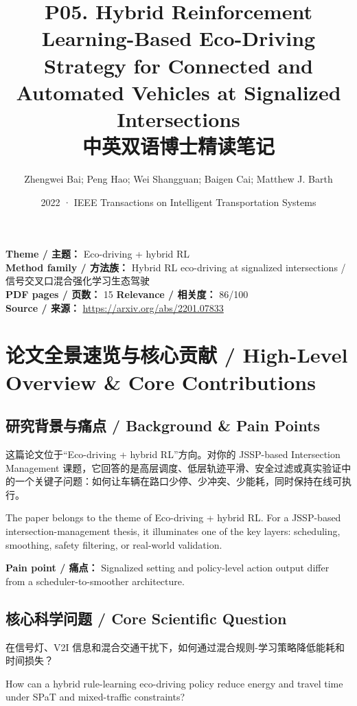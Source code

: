 \documentclass[UTF8,a4paper,11pt,fontset=fandol]{ctexart}
\title{P05. Hybrid Reinforcement Learning-Based Eco-Driving Strategy for Connected and Automated Vehicles at Signalized Intersections\\中英双语博士精读笔记}
\author{Zhengwei Bai; Peng Hao; Wei Shangguan; Baigen Cai; Matthew J. Barth}
\date{2022 · IEEE Transactions on Intelligent Transportation Systems}
\begin{document}
\maketitle

\noindent\textbf{Theme / 主题：} Eco-driving + hybrid RL\\
\textbf{Method family / 方法族：} Hybrid RL eco-driving at signalized intersections / 信号交叉口混合强化学习生态驾驶\\
\textbf{PDF pages / 页数：} 15 \quad
\textbf{Relevance / 相关度：} 86/100\\
\textbf{Source / 来源：} \url{https://arxiv.org/abs/2201.07833}

\section{论文全景速览与核心贡献 / High-Level Overview \& Core Contributions}
\subsection{研究背景与痛点 / Background \& Pain Points}
这篇论文位于“Eco-driving + hybrid RL”方向。对你的 JSSP-based Intersection Management 课题，它回答的是高层调度、低层轨迹平滑、安全过滤或真实验证中的一个关键子问题：如何让车辆在路口少停、少冲突、少能耗，同时保持在线可执行。

The paper belongs to the theme of Eco-driving + hybrid RL. For a JSSP-based intersection-management thesis, it illuminates one of the key layers: scheduling, smoothing, safety filtering, or real-world validation.

\textbf{Pain point / 痛点：} Signalized setting and policy-level action output differ from a scheduler-to-smoother architecture.

\subsection{核心科学问题 / Core Scientific Question}
在信号灯、V2I 信息和混合交通干扰下，如何通过混合规则-学习策略降低能耗和时间损失？

How can a hybrid rule-learning eco-driving policy reduce energy and travel time under SPaT and mixed-traffic constraints?
\end{document}

